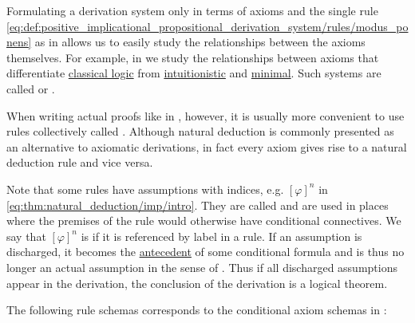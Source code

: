 \begin{proposition}\label{thm:natural_deduction}
  Formulating a derivation system only in terms of axioms and the single rule \eqref{eq:def:positive_implicational_propositional_derivation_system/rules/modus_ponens} as in  allows us to easily study the relationships between the axioms themselves. For example, in  we study the relationships between axioms that differentiate \hyperref[def:classical_logic]{classical logic} from \hyperref[def:intuitionistic_logic]{intuitionistic} and \hyperref[def:minimal_logic]{minimal}. Such systems are called  or .

  When writing actual proofs like in , however, it is usually more convenient to use rules collectively called . Although natural deduction is commonly presented as an alternative to axiomatic derivations, in fact every axiom gives rise to a natural deduction rule and vice versa.

  Note that some rules have assumptions with indices, e.g. \( [\varphi]^n \) in \eqref{eq:thm:natural_deduction/imp/intro}. They are called  and are used in places where the premises of the rule would otherwise have conditional connectives. We say that \( [\varphi]^n \) is  if it is referenced by label in a rule. If an assumption is discharged, it becomes the \hyperref[def:material_implication/antecedent]{antecedent} of some conditional formula and is thus no longer an actual assumption in the sense of . Thus if all discharged assumptions appear in the derivation, the conclusion of the derivation is a logical theorem.

  \begin{thmenum}
     The following rule schemas corresponds to the conditional axiom schemas in :


\end{thmenum}
\end{proposition}
